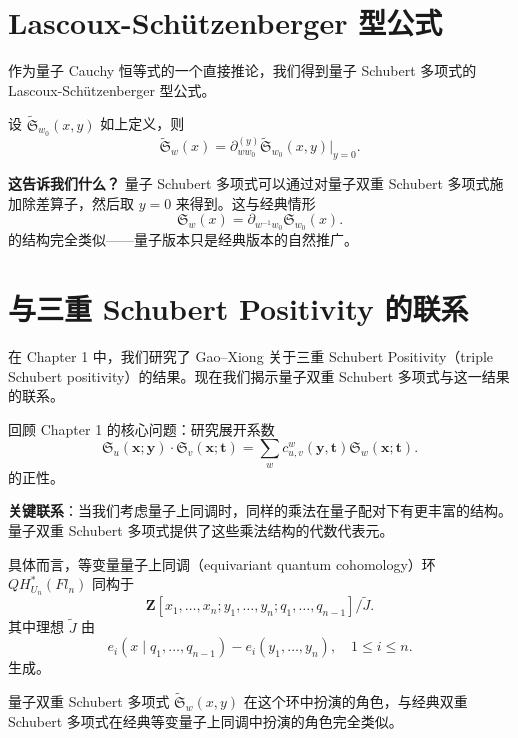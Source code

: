 \section{Lascoux-Schützenberger 型公式}
\label{sec:LascouxFormula}

作为量子 Cauchy 恒等式的一个直接推论，我们得到量子 Schubert 多项式的 Lascoux-Schützenberger 型公式。

\begin{Corollary}
\label{cor:QuantumLascoux}
设 $\widetilde{\mathfrak{S}}_{w_0}(x,y)$ 如上定义，则
\[
\widetilde{\mathfrak{S}}_w(x) = \partial_{ww_0}^{(y)} \widetilde{\mathfrak{S}}_{w_0}(x,y) \big|_{y=0}.
\label{eq:QuantumLascouxFormula}
\]
\end{Corollary}

\textbf{这告诉我们什么？} 量子 Schubert 多项式可以通过对量子双重 Schubert 多项式施加除差算子，然后取 $y=0$ 来得到。这与经典情形
\[
\mathfrak{S}_w(x) = \partial_{w^{-1}w_0} \mathfrak{S}_{w_0}(x).
\label{eq:ClassicalLascouxFormula}
\]
的结构完全类似——量子版本只是经典版本的自然推广。

\section{与三重 Schubert Positivity 的联系}
\label{sec:ConnectionTriplePositivity}

在 Chapter 1 中，我们研究了 Gao--Xiong \cite{GX2025} 关于三重 Schubert Positivity（triple Schubert positivity）的结果。现在我们揭示量子双重 Schubert 多项式与这一结果的联系。

回顾 Chapter 1 的核心问题：研究展开系数
\[
\mathfrak{S}_u(\mathbf{x}; \mathbf{y}) \cdot \mathfrak{S}_v(\mathbf{x}; \mathbf{t}) = \sum_w c^w_{u,v}(\mathbf{y}, \mathbf{t}) \mathfrak{S}_w(\mathbf{x}; \mathbf{t}).
\label{eq:TripleProductExpansion}
\]
的正性。

\textbf{关键联系}：当我们考虑量子上同调时，同样的乘法在量子配对下有更丰富的结构。量子双重 Schubert 多项式提供了这些乘法结构的代数代表元。

具体而言，等变量量子上同调（equivariant quantum cohomology）环 $QH^*_{U_n}(Fl_n)$ 同构于
\[
\mathbf{Z}[x_1, \ldots, x_n; y_1, \ldots, y_n; q_1, \ldots, q_{n-1}] / \widetilde{J}.
\label{eq:EquivariantQuantumCohomology}
\]
其中理想 $\widetilde{J}$ 由
\[
e_i(x \mid q_1, \ldots, q_{n-1}) - e_i(y_1, \ldots, y_n), \quad 1 \leq i \leq n.
\label{eq:QuantumIdealRelations}
\]
生成。

量子双重 Schubert 多项式 $\widetilde{\mathfrak{S}}_w(x,y)$ 在这个环中扮演的角色，与经典双重 Schubert 多项式在经典等变量子上同调中扮演的角色完全类似。

